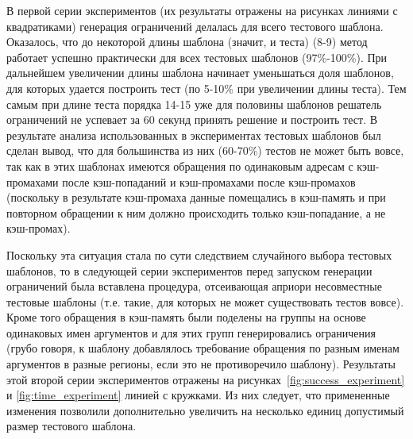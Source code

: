 В первой серии экспериментов (их результаты отражены на рисунках линиями с
квадратиками) генерация ограничений делалась для всего тестового шаблона.
Оказалось, что до некоторой длины шаблона (значит, и теста) (8-9) метод работает
успешно практически для всех тестовых шаблонов (97\%-100\%). При дальнейшем
увеличении длины шаблона начинает уменьшаться доля шаблонов, для которых удается
построить тест (по 5-10\% при увеличении длины теста). Тем самым при длине теста
порядка 14-15 уже для половины шаблонов решатель ограничений не успевает за 60
секунд принять решение и построить тест. В результате анализа использованных в
экспериментах тестовых шаблонов был сделан вывод, что для большинства из них
(60-70\%) тестов не может быть вовсе, так как в этих шаблонах имеются обращения
по одинаковым адресам с кэш-промахами после кэш-попаданий и кэш-промахами после
кэш-промахов (поскольку в результате кэш-промаха данные помещались в кэш-память
и при повторном обращении к ним должно происходить только кэш-попадание, а не
кэш-промах).

Поскольку эта ситуация стала по сути следствием случайного выбора тестовых
шаблонов, то в следующей серии экспериментов перед запуском генерации
ограничений была вставлена процедура, отсеивающая априори несовместные тестовые
шаблоны (т.е. такие, для которых не может существовать тестов вовсе). Кроме того
обращения в кэш-память были поделены на группы на основе одинаковых имен
аргументов и для этих групп генерировались ограничения (грубо говоря, к шаблону
добавлялось требование обращения по разным именам аргументов в разные регионы,
если это не противоречило шаблону). Результаты этой второй серии экспериментов
отражены на рисунках~\ref{fig:success_experiment} и \ref{fig:time_experiment}
линией с кружками. Из них следует, что примененные изменения позволили
дополнительно увеличить на несколько единиц допустимый размер тестового шаблона.

